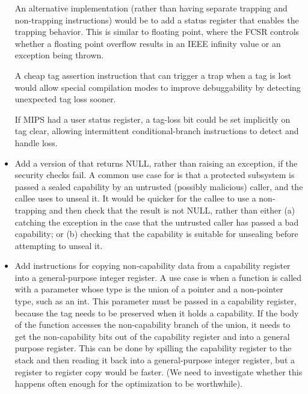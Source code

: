 \begin{itemize}
  An alternative implementation (rather than having separate trapping and
  non-trapping instructions) would be to add a status register that enables
  the trapping behavior. This is similar to floating point, where the
  FCSR controls whether a floating point overflow results in an IEEE
  infinity value or an exception being thrown.

  A cheap tag assertion instruction that can trigger a trap when a tag is lost
  would allow special compilation modes to improve debuggability by detecting
  unexpected tag loss sooner.

  If MIPS had a user status register, a tag-loss bit could be set implicitly
  on tag clear, allowing intermittent conditional-branch instructions to detect
  and handle loss.

\item
  Add a version of  that returns NULL, rather than
  raising an exception, if the security checks fail. A common use case
  for  is that a protected subsystem is passed a sealed
  capability by an untrusted (possibly malicious) caller, and the callee uses
   to unseal it. It would be quicker for the callee
  to use a non-trapping  and then check that the result
  is not NULL, rather than either (a) catching the exception in the case that
  the untrusted caller has passed a bad capability; or (b) checking that
  the capability is suitable for unsealing before attempting to unseal it.


\item
  Add instructions for copying non-capability data from a capability register
  into a general-purpose integer register. A use case is when a function is called
  with a parameter whose type is the union of a pointer and a non-pointer type,
  such as an int. This parameter must be passed in a capability register, because
  the tag needs to be preserved when it holds a capability. If the body of
  the function accesses the non-capability branch of the union, it needs to
  get the non-capability bits out of the capability register and into a general
  purpose register. This can be done by spilling the capability register to the
  stack and then reading it back into a general-purpose integer register, but a register
  to register copy would be faster. (We need to investigate whether this happens
  often enough for the optimization to be worthwhile).


\end{itemize}
